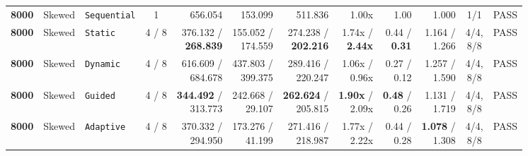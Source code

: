 \documentclass[11pt,a4paper]{article}
\renewcommand{\_}{\textunderscore\allowbreak}
\begin{document}
\begin{table}[H]
{\begin{tabular}{r l l c r r r r r r c c}
\textbf{8000} & Skewed & \texttt{Sequential} & 1 & 656.054 & 153.099 & 511.836 & 1.00x & 1.00 & 1.000 & 1/1 & PASS \\
\textbf{8000} & Skewed & \texttt{Static} & 4 / 8 & \makecell[r]{376.132 /\\ \textbf{268.839}} & \makecell[r]{155.052 /\\ 174.559} & \makecell[r]{274.238 /\\ \textbf{202.216}} & \makecell[r]{1.74x /\\ \textbf{2.44x}} & \makecell[r]{0.44 /\\ \textbf{0.31}} & \makecell[r]{1.164 /\\ 1.266} & \makecell[c]{4/4,\\ 8/8} & PASS \\
\textbf{8000} & Skewed & \texttt{Dynamic} & 4 / 8 & \makecell[r]{616.609 /\\ 684.678} & \makecell[r]{437.803 /\\ 399.375} & \makecell[r]{289.416 /\\ 220.247} & \makecell[r]{1.06x /\\ 0.96x} & \makecell[r]{0.27 /\\ 0.12} & \makecell[r]{1.257 /\\ 1.590} & \makecell[c]{4/4,\\ 8/8} & PASS \\
\textbf{8000} & Skewed & \texttt{Guided} & 4 / 8 & \makecell[r]{\textbf{344.492} /\\ 313.773} & \makecell[r]{242.668 /\\ 29.107} & \makecell[r]{\textbf{262.624} /\\ 205.815} & \makecell[r]{\textbf{1.90x} /\\ 2.09x} & \makecell[r]{\textbf{0.48} /\\ 0.26} & \makecell[r]{1.131 /\\ 1.719} & \makecell[c]{4/4,\\ 8/8} & PASS \\
\textbf{8000} & Skewed & \texttt{Adaptive} & 4 / 8 & \makecell[r]{370.332 /\\ 294.950} & \makecell[r]{173.276 /\\ 41.199} & \makecell[r]{271.416 /\\ 218.987} & \makecell[r]{1.77x /\\ 2.22x} & \makecell[r]{0.44 /\\ 0.28} & \makecell[r]{\textbf{1.078} /\\ 1.308} & \makecell[c]{4/4,\\ 8/8} & PASS \\
\bottomrule
\end{tabular}%
}
\end{table}
\end{document}
